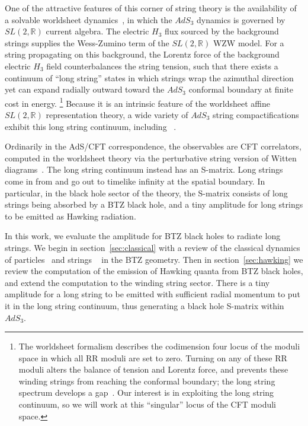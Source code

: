 \documentclass[11pt]{article}
\newcommand{\rcite}{\cite}
\def\sltwo{\ensuremath{SL(2,\bR)}}
\newcommand{\bR}{{\mathbb R}}
\numberwithin{equation}{section}
\begin{document}
One of the attractive features of this corner of string theory is the availability of a solvable worldsheet dynamics~\rcite{Giveon:1998ns,Kutasov:1999xu,Maldacena:2000hw,Maldacena:2001km,Giveon:1999px,Giveon:1999tq}, in which the $AdS_3$ dynamics is governed by $\sltwo$ current algebra.  
The electric $H_3$ flux sourced by the background strings supplies the Wess-Zumino term of the $\sltwo$ WZW model.  For a string propagating on this background, the Lorentz force of the background electric $H_3$ field counterbalances the string tension, such that there exists a continuum of ``long string'' states in which strings wrap the azimuthal direction yet can expand radially outward toward the $AdS_3$ conformal boundary at finite cost in energy.%
\footnote{The worldsheet formalism describes the codimension four locus of the moduli space in which all RR moduli are set to zero.  Turning on any of these RR moduli alters the balance of tension and Lorentz force, and prevents these winding strings from reaching the conformal boundary; the long string spectrum develops a gap~\rcite{Seiberg:1999xz}.  Our interest is in exploiting the long string continuum, so we will work at this ``singular'' locus of the CFT moduli space.}
Because it is an intrinsic feature of the worldsheet affine $\sltwo$ representation theory, a wide variety of $AdS_3$ string compactifications exhibit this long string continuum, including%
~\rcite{%
Elitzur:1998mm,
deBoer:1998gyt,
Kutasov:1998zh,
Giveon:1999jg,
Giveon:1999zm,
Argurio:2000tg,
Argurio:2000tb,
Argurio:2000xm}.

Ordinarily in the AdS/CFT correspondence, the observables are CFT correlators, computed in the worldsheet theory via the perturbative string version of Witten diagrams~\rcite{Kutasov:1999xu,Maldacena:2001km}.
The long string continuum instead has an S-matrix.  
Long strings come in from and go out to timelike infinity at the spatial boundary.  In particular, in the black hole sector of the theory, the S-matrix consists of long strings being absorbed by a BTZ black hole, and a tiny amplitude for long strings to be emitted as Hawking radiation.  


In this work, we evaluate the amplitude for BTZ black holes to radiate long strings.  We begin in section~\ref{sec:classical} with a review of the classical dynamics of particles~\rcite{Farina:1993xw,Cruz:1994ir} and strings%
~\rcite{%
Natsuume:1996ij,
Hemming:2001we,
Hemming:2002kd,
Troost:2002wk,
Ashok:2021ffx,
Nippanikar:2021skr,
Ashok:2022vdz} 
in the BTZ geometry.
Then in section~\ref{sec:hawking} we review the computation of the emission of Hawking quanta from BTZ black holes, and extend the computation to the winding string sector.  There is a tiny amplitude for a long string to be emitted with sufficient radial momentum to put it in the long string continuum, thus generating a black hole S-matrix within $AdS_3$.   
\end{document}
